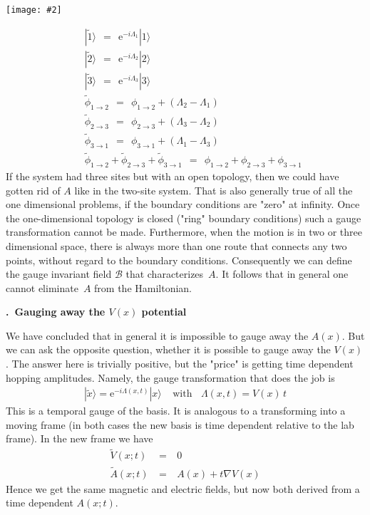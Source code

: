 \documentclass[onecolumn,fleqn, 11pt]{revtex4}
\newcommand{\putgraph}[2][0.30\hsize]{\texttt{[image: \#2]}}
\newcommand{\beq}{\begin{eqnarray}}
\newcommand{\eeq}{\end{eqnarray}}
\renewcommand{\thesubsection}{\arabic{subsection}}
\renewcommand{\thesubsubsection}{\arabic{subsubsection}}
\newcommand{\sheadC}[1]
{
\addtocounter{subsubsection}{1}
\vspace{5mm}
{\bf \thesubsection.\thesubsubsection \ #1}  
\nopagebreak
\phantomsection
}
\begin{document}
\begin{center}
\putgraph[0.2\hsize]{ClosedThreeSiteSystem}
\end{center}


\beq
&& | \tilde{1} \rangle \ \ = \ \ \mbox{e}^{-i \Lambda_1} | 1 \rangle 
\\ \nonumber
&& | \tilde{2} \rangle \ \ = \ \ \mbox{e}^{-i \Lambda_2} | 2 \rangle 
\\ \nonumber
&& | \tilde{3} \rangle \ \ = \ \ \mbox{e}^{-i \Lambda_3} | 3 \rangle 
\\ \nonumber
&& \tilde{\phi}_{1\rightarrow 2} \ \ = \ \ \phi_{1\rightarrow 2} + ( \Lambda_2 - \Lambda_1 ) 
\\ \nonumber
&& \tilde{\phi}_{2\rightarrow 3} \ \ = \ \ \phi_{2\rightarrow 3} + ( \Lambda_3 - \Lambda_2 ) 
\\ \nonumber
&& \tilde{\phi}_{3\rightarrow 1} \ \ = \ \ \phi_{3\rightarrow 1} + ( \Lambda_1 - \Lambda_3 ) 
\\ \nonumber
&& \tilde{\phi}_{1\rightarrow 2} + \tilde{\phi}_{2\rightarrow 3} + \tilde{\phi}_{3\rightarrow 1} 
\ \ = \ \ \phi_{1\rightarrow 2} + \phi_{2\rightarrow 3} + \phi_{3\rightarrow 1} 
\eeq
If the system had three sites but with an open topology, 
then we could have gotten rid of $A$ like in the two-site system. 
That is also generally true of all the one dimensional problems, 
if the boundary conditions are "zero" at infinity. 
Once the one-dimensional topology is closed ("ring" boundary conditions) 
such a gauge transformation cannot be made. Furthermore, 
when the motion is in two or three dimensional space, there is 
always more than one route that connects any two points, without 
regard to the boundary conditions. Consequently 
we can define the gauge invariant field $\mathcal{B}$ that 
characterizes~$A$. It follows that in general one cannot eliminate~$A$ 
from the Hamiltonian.  


\sheadC{Gauging away the $V(x)$ potential}

We have concluded that in general it is impossible to gauge away the $A(x)$. 
But we can ask the opposite question, whether it is possible to gauge away the $V(x)$. 
The answer here is trivially positive, but the "price" is getting time dependent 
hopping amplitudes. Namely, the gauge transformation that does the job is 
\beq
| \tilde{x} \rangle = \mbox{e}^{-i \Lambda(x,t)} | x \rangle 
\ \ \ \ \ \mbox{with} \ \ \ \ \Lambda(x,t)=V(x) \, t
\eeq  
This is a temporal gauge of the basis. It is analogous to a transforming into a moving frame 
(in both cases the new basis is time dependent relative to the lab frame). 
In the new frame we have 
\beq
\tilde{V}(x;t) \ &=& \ 0 \\
\tilde{A}(x;t) \ &=& \ A(x) + t\nabla V(x)   
\eeq 
Hence we get the same magnetic and electric fields, 
but now both derived from a time dependent $A(x;t)$. 
\end{document}
